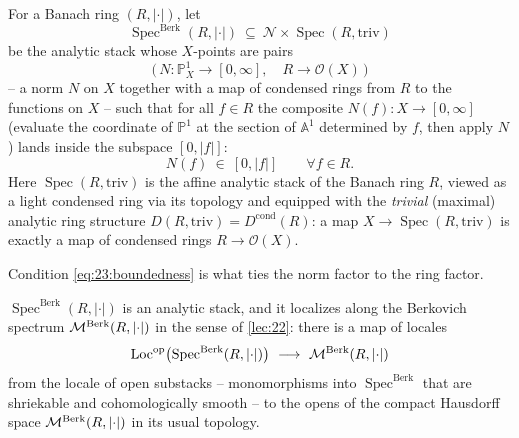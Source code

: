 \begin{definition}
\label{def:23:berkovich-spectrum}
For a Banach ring $(R,\lvert\cdot\rvert)$, let
\begin{equation*}
\operatorname{Spec}^{\mathrm{Berk}}(R,\lvert\cdot\rvert)\ \subseteq\
\mathcal N\times\operatorname{Spec}(R,\mathrm{triv})
\end{equation*}
be the analytic stack whose $X$-points are pairs
\begin{equation*}
\bigl(\,N\colon\mathbb P^1_X\to[0,\infty],\quad R\to\mathcal O(X)\,\bigr)
\end{equation*}
-- a norm $N$ on $X$ together with a map of condensed rings from $R$ to the
functions on $X$ -- such that for all $f\in R$ the composite
$N(f)\colon X\to[0,\infty]$ (evaluate the coordinate of $\mathbb P^1$ at the
section of $\mathbb A^1$ determined by $f$, then apply $N$) lands inside the
subspace $[0,\lvert f\rvert]$:
\begin{equation}
\label{eq:23:boundedness}
N(f)\ \in\ [0,\lvert f\rvert]\qquad\forall f\in R .
\end{equation}
Here $\operatorname{Spec}(R,\mathrm{triv})$ is the affine analytic stack of the
Banach ring $R$, viewed as a light condensed ring via its topology and equipped
with the \emph{trivial} (maximal) analytic ring structure
$D(R,\mathrm{triv})=D^{\mathrm{cond}}(R)$: a map $X\to\operatorname{Spec}(R,\mathrm{triv})$
is exactly a map of condensed rings $R\to\mathcal O(X)$.
\end{definition}

Condition \eqref{eq:23:boundedness} is what ties the norm factor to the ring
factor.

\begin{theorem}
\label{thm:23:localizes}
$\operatorname{Spec}^{\mathrm{Berk}}(R,\lvert\cdot\rvert)$ is an analytic stack,
and it localizes along the Berkovich spectrum
$\mathcal{M}^{\mathrm{Berk}}(R,\lvert\cdot\rvert)$ in the sense of \cref{lec:22}: there is a map of
locales
\begin{equation}
\label{eq:23:loc-map}
\operatorname{Loc}^{\mathrm{op}}\bigl(\operatorname{Spec}^{\mathrm{Berk}}(R,\lvert\cdot\rvert)\bigr)
\ \longrightarrow\ \mathcal{M}^{\mathrm{Berk}}(R,\lvert\cdot\rvert)
\end{equation}
from the locale of open substacks -- monomorphisms into
$\operatorname{Spec}^{\mathrm{Berk}}$ that are shriekable and cohomologically
smooth -- to the opens of the compact Hausdorff space
$\mathcal{M}^{\mathrm{Berk}}(R,\lvert\cdot\rvert)$ in its usual topology.
\end{theorem}

